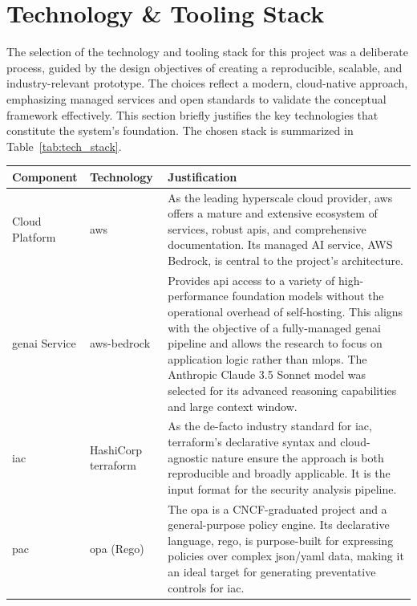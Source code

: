 \section{Technology \& Tooling Stack}
\label{sec:tech_stack}

The selection of the technology and tooling stack for this project was a deliberate process, guided by the design objectives of creating a reproducible, scalable, and industry-relevant prototype. The choices reflect a modern, \gls{cloud-native} approach, emphasizing managed services and open standards to validate the conceptual framework effectively. This section briefly justifies the key technologies that constitute the system's foundation. The chosen stack is summarized in Table~\ref{tab:tech_stack}.
\begin{center}
\begin{tabular}{|l|l|p{7cm}|}
\hline
\textbf{Component} & \textbf{Technology} & \textbf{Justification} \\
\hline
Cloud Platform & \gls{aws} & As the leading \gls{hyperscale} cloud provider, \gls{aws} offers a mature and extensive ecosystem of services, robust \gls{api}s, and comprehensive documentation. Its managed AI service, AWS Bedrock, is central to the project's architecture. \\
\hline
\gls{genai} Service & \gls{aws-bedrock} \cite{noauthor_claude_nodate} & Provides \gls{api} access to a variety of high-performance foundation models without the operational overhead of self-hosting. This aligns with the objective of a fully-managed \gls{genai} pipeline and allows the research to focus on application logic rather than \gls{mlops}. The Anthropic Claude 3.5 Sonnet model was selected for its advanced reasoning capabilities and large context window. \\
\hline
\gls{iac} & HashiCorp \gls{terraform} \cite{noauthor_terraform_nodate} & As the de-facto industry standard for \gls{iac}, \gls{terraform}'s declarative syntax and cloud-agnostic nature ensure the approach is both reproducible and broadly applicable. It is the input format for the security analysis pipeline. \\
\hline
\gls{pac} & \gls{opa} (Rego) \cite{noauthor_introduction_nodate} & The \gls{opa} is a CNCF-graduated project and a general-purpose policy engine. Its declarative language, \gls{rego}, is purpose-built for expressing policies over complex \gls{json}/\gls{yaml} data, making it an ideal target for generating preventative controls for \gls{iac}. \\

\end{tabular}
\end{center}
